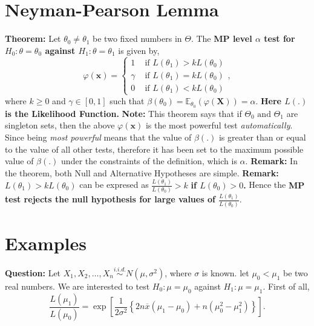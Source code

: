 \documentclass{article}
\begin{document}
\section{Neyman-Pearson Lemma}
\textbf{Theorem: }Let $\theta_0 \neq  \theta_1$ be two fixed numbers in $\Theta$. The  \textbf{MP level $\alpha$ test for $H_0:\theta = \theta_0$ against $H_1:\theta = \theta_1$} is given by,
\[
		\varphi\left( \mathbf{x} \right)  = \begin{cases}
			1 & \text{ if } L\left( \theta_1 \right)  > kL\left( \theta_0 \right) \\
			\gamma & \text{ if } L\left( \theta_1 \right) = kL\left( \theta_0 \right) \\
			0 & \text{ if } L\left( \theta_1 \right) < kL\left( \theta_0 \right) 
		\end{cases}
	,\] 
	where $k \ge 0$ and $\gamma \in \left[ 0,1 \right] $ such that $\beta\left( \theta_0 \right) = \mathbb{E}_{\theta_0} \left( \varphi \left( \mathbf{X} \right)  \right) = \alpha $.\textbf{ Here $L\left( . \right) $ is the Likelihood Function.}
\newline\newline
\textbf{Note:} This theorem says that if $\Theta_0 \text{ and } \Theta_1$ are singleton sets, then the above $\varphi\left( \mathbf{x} \right) $ is the most powerful test \textit{automatically}. Since being \textit{most powerful}
means that the value of $\beta\left( . \right) $ is greater than or equal to the value of all other tests, therefore
it has been set to the maximum possible value of $\beta\left( . \right) $ under the constraints of the definition, which is $\alpha$.
\newline\newline
\textbf{Remark:} In the theorem, both Null and Alternative Hypotheses are simple.
\newline\newline
\textbf{Remark:} $L \left( \theta_1 \right) > kL\left( \theta_0 \right) $ can be expresed as $\frac{L\left( \theta_1 \right) }{L\left( \theta_0 \right) } > k$ \textbf{if $L\left( \theta_0 \right) > 0$.} Hence the \textbf{MP test rejects the null hypothesis for large values of $\frac{L\left( \theta_1 \right) }{L\left( \theta_0 \right) }$}.



\section{Examples}
\textbf{Question: } Let $X_1,X_2,\dots,X_{n} \overset{i.i.d.}{\sim} N\left( \mu, \sigma^{2} \right) $, where $\sigma$ is known. let $\mu_0<\mu_1$ be two real numbers. We are interested to test $H_0 : \mu = \mu_0$ against $H_1: \mu = \mu_1$.
\newline\newline
First of all, 
\[
	\frac{L\left( \mu_1 \right) }{L\left( \mu_0 \right) } = \exp\left[ \frac{1}{2\sigma^{2}}\left\{ 2n\overline{x}\left( \mu_1 - \mu_0 \right)  + n\left( \mu_0^2 - \mu_1^2 \right)  \right\}  \right] 	
.\]
\end{document}

